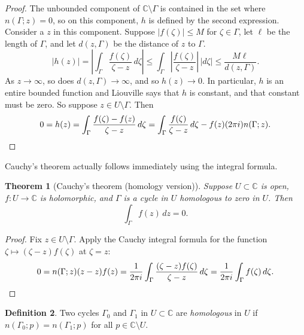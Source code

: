 \documentclass[12pt,openany]{book}
\newcommand{\sabs}[1]{\lvert {#1} \rvert}
\newcommand{\abs}[1]{\left\lvert {#1} \right\rvert}
\newcommand{\C}{{\mathbb{C}}}
\newcommand{\myindex}[1]{#1\index{#1}}
\theoremstyle{plain}
\newtheorem{thm}{Theorem}[section]
\theoremstyle{remark}
\theoremstyle{definition}
\newtheorem{defn}[thm]{Definition}
\theoremstyle{exercise}
\theoremstyle{example}
\begin{document}
\begin{proof}
The unbounded component of $\C \setminus \Gamma$ is contained in the
set where $n(\Gamma;z) = 0$, so on this component, $h$ is defined by the
second expression.  Consider a $z$ in this component.
Suppose $\sabs{f(\zeta)} \leq M$ for $\zeta \in \Gamma$, let $\ell$ be the length of
$\Gamma$, and let $d(z,\Gamma)$ be the distance of $z$ to $\Gamma$.
\begin{equation*}
\sabs{h(z)}
=
\abs{
\int_\Gamma \frac{f(\zeta)}{\zeta-z} \, d\zeta
}
\leq
\int_\Gamma \abs{\frac{f(\zeta)}{\zeta-z}} \, \sabs{d\zeta}
\leq
\frac{M \ell}{d(z,\Gamma)} .
\end{equation*}
As $z \to \infty$, so does $d(z,\Gamma) \to \infty$, and so $h(z) \to 0$.
In particular, $h$ is an entire bounded function and
Liouville says that $h$ is constant, and that constant must be zero.
So suppose $z \in U \setminus \Gamma$.  Then
\begin{equation*}
0 = h(z) =
\int_\Gamma \frac{f(\zeta)-f(z)}{\zeta-z} \, d\zeta
=
\int_\Gamma \frac{f(\zeta)}{\zeta-z} \, d\zeta
-
f(z) (2\pi i) n(\Gamma;z) . \qedhere
\end{equation*}
\end{proof}

Cauchy's theorem actually follows immediately using the integral formula.

\begin{thm}[Cauchy's theorem (homology version)]
%
\label{thm:CThomology}%
Suppose $U \subset \C$ is open,
$f \colon U \to \C$ is holomorphic,
and $\Gamma$ is
a cycle
in $U$
homologous to zero in $U$.
Then
\begin{equation*}
\int_\Gamma f(z) \, dz = 0 .
\end{equation*}
\end{thm}

\begin{proof}
Fix $z \in U \setminus \Gamma$.  Apply 
the Cauchy integral formula for the function $\zeta \mapsto
(\zeta-z)f(\zeta)$ at $\zeta=z$:
\begin{equation*}
0 = n(\Gamma;z) (z-z)f(z) =
\frac{1}{2\pi i} \int_\Gamma \frac{(\zeta-z)f(\zeta)}{\zeta-z} \, d\zeta
=
\frac{1}{2\pi i} \int_\Gamma f(\zeta) \, d\zeta . \qedhere
\end{equation*}
\end{proof}

\begin{defn}
Two cycles
$\Gamma_0$ and $\Gamma_1$ in $U
\subset \C$ are \emph{\myindex{homologous}} in $U$
if $n(\Gamma_0;p) = n(\Gamma_1;p)$ for all $p \in \C \setminus U$.
\end{defn}
\end{document}
